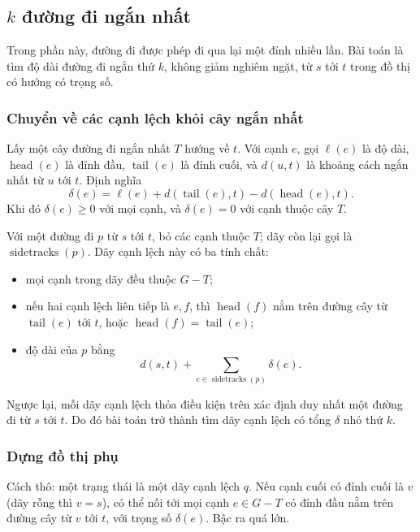 \documentclass[11pt]{article}
\begin{document}
\subsection{\texorpdfstring{\(k\)}{k} đường đi ngắn nhất}

Trong phần này, đường đi được phép đi qua lại một đỉnh nhiều lần. Bài toán là
tìm độ dài đường đi ngắn thứ \(k\), không giảm nghiêm ngặt, từ \(s\) tới \(t\)
trong đồ thị có hướng có trọng số.

\subsubsection{Chuyển về các cạnh lệch khỏi cây ngắn nhất}

Lấy một cây đường đi ngắn nhất \(T\) hướng về \(t\). Với cạnh \(e\), gọi
\(\ell(e)\) là độ dài, \(\operatorname{head}(e)\) là đỉnh đầu,
\(\operatorname{tail}(e)\) là đỉnh cuối, và \(d(u,t)\) là khoảng cách ngắn nhất
từ \(u\) tới \(t\). Định nghĩa
\[
  \delta(e)=\ell(e)+d(\operatorname{tail}(e),t)
              -d(\operatorname{head}(e),t).
\]
Khi đó \(\delta(e)\ge 0\) với mọi cạnh, và \(\delta(e)=0\) với cạnh thuộc cây
\(T\).

Với một đường đi \(p\) từ \(s\) tới \(t\), bỏ các cạnh thuộc \(T\); dãy còn lại
gọi là \(\operatorname{sidetracks}(p)\). Dãy cạnh lệch này có ba tính chất:
\begin{itemize}
  \item mọi cạnh trong dãy đều thuộc \(G-T\);
  \item nếu hai cạnh lệch liên tiếp là \(e,f\), thì
  \(\operatorname{head}(f)\) nằm trên đường cây từ \(\operatorname{tail}(e)\)
  tới \(t\), hoặc \(\operatorname{head}(f)=\operatorname{tail}(e)\);
  \item độ dài của \(p\) bằng
  \[
    d(s,t)+\sum_{e\in\operatorname{sidetracks}(p)}\delta(e).
  \]
\end{itemize}
Ngược lại, mỗi dãy cạnh lệch thỏa điều kiện trên xác định duy nhất một đường đi
từ \(s\) tới \(t\). Do đó bài toán trở thành tìm dãy cạnh lệch có tổng
\(\delta\) nhỏ thứ \(k\).

\subsubsection{Dựng đồ thị phụ}

Cách thô: một trạng thái là một dãy cạnh lệch \(q\). Nếu cạnh cuối có đỉnh cuối
là \(v\) (dãy rỗng thì \(v=s\)), có thể nối tới mọi cạnh \(e\in G-T\) có đỉnh
đầu nằm trên đường cây từ \(v\) tới \(t\), với trọng số \(\delta(e)\). Bậc ra
quá lớn.
\end{document}
